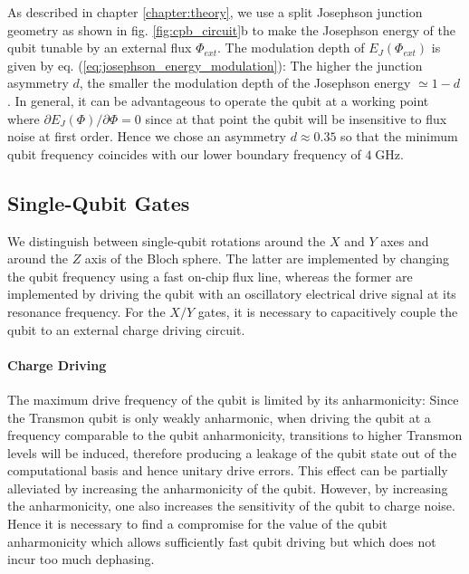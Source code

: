 \smallskip

As described in chapter \ref{chapter:theory}, we use a split Josephson junction geometry as shown in fig. \ref{fig:cpb_circuit}b to make the Josephson energy of the qubit tunable by an external flux $\Phi_{ext}$. The modulation depth of $E_J(\Phi_{ext})$ is given by eq. (\ref{eq:josephson_energy_modulation}): The higher the junction asymmetry $d$, the smaller the modulation depth of the Josephson energy $\simeq 1-d$. In general, it can be advantageous to operate the qubit at a working point where $\partial E_J(\Phi)/\partial \Phi=0$ since at that point the qubit will be insensitive to flux noise at first order. Hence we chose an asymmetry $d\approx 0.35$ so that the minimum qubit frequency coincides with our lower boundary frequency of $4\;\mathrm{GHz}$.

\subsection{Single-Qubit Gates} \label{section:qubit_driving}

We distinguish between single-qubit rotations around the $X$ and $Y$ axes and around the $Z$ axis of the Bloch sphere. The latter are implemented by changing the qubit frequency using a fast on-chip flux line, whereas the former are implemented by driving the qubit with an oscillatory electrical drive signal at its resonance frequency. For the $X/Y$ gates, it is necessary to capacitively couple the qubit to an external charge driving circuit. 

\paragraph{Charge Driving} \label{section:charge_driving}

The maximum drive frequency of the qubit is limited by its anharmonicity: Since the Transmon qubit is only weakly anharmonic, when driving the qubit at a frequency comparable to the qubit anharmonicity, transitions to higher Transmon levels will be induced, therefore producing a leakage of the qubit state out of the computational basis and hence unitary drive errors. This effect can be partially alleviated by increasing the anharmonicity of the qubit. However, by increasing the anharmonicity, one also increases the sensitivity of the qubit to charge noise. Hence it is necessary to find a compromise for the value of the qubit anharmonicity which allows sufficiently fast qubit driving but which does not incur too much dephasing.


